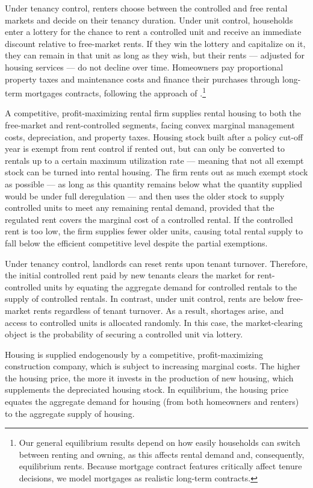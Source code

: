 \documentclass[parskip=full]{article}
\begin{document}
Under tenancy control, renters choose between the controlled and free rental markets and decide on their tenancy duration. Under unit control, households enter a lottery for the chance to rent a controlled unit and receive an immediate discount relative to free-market rents. If they win the lottery and capitalize on it, they can remain in that unit as long as they wish, but their rents — adjusted for housing services — do not decline over time. Homeowners pay proportional property taxes and maintenance costs and finance their purchases through long-term mortgages contracts, following the approach of \citet{kkk-2021}.\footnote{Our general equilibrium results depend on how easily households can switch between renting and owning, as this affects rental demand and, consequently, equilibrium rents. Because mortgage contract features critically affect tenure decisions, we model mortgages as realistic long-term contracts.} 

A competitive, profit-maximizing rental firm supplies rental housing to both the free-market and rent-controlled segments, facing convex marginal management costs, depreciation, and property taxes. Housing stock built after a policy cut-off year is exempt from rent control if rented out, but can only be converted to rentals up to a certain maximum utilization rate — meaning that not all exempt stock can be turned into rental housing. The firm rents out as much exempt stock as possible — as long as this quantity remains below what the quantity supplied would be under full deregulation — and then uses the older stock to supply controlled units to meet any remaining rental demand, provided that the regulated rent covers the marginal cost of a controlled rental. If the controlled rent is too low, the firm supplies fewer older units, causing total rental supply to fall below the efficient competitive level despite the partial exemptions.

Under tenancy control, landlords can reset rents upon tenant turnover. Therefore, the initial controlled rent paid by new tenants clears the market for rent-controlled units by equating the aggregate demand for controlled rentals to the supply of controlled rentals. In contrast, under unit control, rents are below free-market rents regardless of tenant turnover. As a result, shortages arise, and access to controlled units is allocated randomly. In this case, the market-clearing object is the probability of securing a controlled unit via lottery.

Housing is supplied endogenously by a competitive, profit-maximizing construction company, which is subject to increasing marginal costs. The higher the housing price, the more it invests in the production of new housing, which supplements the depreciated housing stock. In equilibrium, the housing price equates the aggregate demand for housing (from both homeowners and renters) to the aggregate supply of housing.
\end{document}
